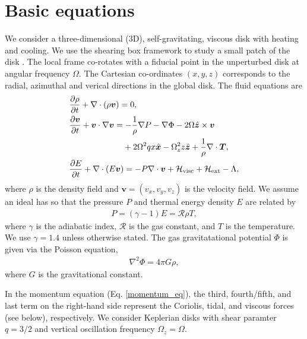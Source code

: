 \section{Basic equations}
We consider a three-dimensional (3D), self-gravitating,
viscous disk with heating and cooling. We use the shearing box framework to
study a small patch of the disk \citep{goldreich65}. The local frame
co-rotates with a fiducial point in the unperturbed disk at angular
frequency $\Omega$. The Cartesian co-ordinates $(x,y,z)$ corresponds
to the radial, azimuthal and verical directions in the global disk. 
The fluid equations are
\begin{align}
  &\frac{\p\rho}{\p t} + \nabla\cdot\left(\rho\bm{v}\right) = 0, \\
  & \frac{\p\bm{v}}{\p t} + \bm{v}\cdot\nabla\bm{v} =
  -\frac{1}{\rho}\nabla P - \nabla\Phi - 2\Omega\hat{\bm{z}}\times\bm{v}\notag\\ & 
  \phantom{\frac{\p\bm{v}}{\p t} + \bm{v}\cdot\nabla\bm{v} =}
  +2\Omega^2qx\hat{\bm{x}} -\Omega_z^2z\hat{\bm{z}} 
   + \frac{1}{\rho}\nabla\cdot\bm{T},\label{momentum_eq}\\
  & \frac{\p E}{\p t} + \nabla\cdot\left(E\bm{v}\right) = - P
  \nabla\cdot\bm{v} + \mathcal{H}_\mathrm{visc} +
  \mathcal{H}_\mathrm{ext} - \Lambda,\label{energy_eq}
\end{align} 
where $\rho$ is the density field and $\bm{v} = (v_x, v_y, v_z)$ is
the velocity field.%
We assume an ideal has so that the pressure $P$ and thermal energy
density $E$ are related by  
\begin{align}
  P = (\gamma-1)E = \mathcal{R}\rho T, 
\end{align}
where $\gamma$ is the adiabatic index, $\mathcal{R}$ is the gas
constant, and $T$ is the temperature. We use $\gamma=1.4$ unless
otherwise stated. The gas 
gravitatational potential $\Phi$ is given via the Poisson equation,  
\begin{align}
 \nabla^2\Phi = 4 \pi G \rho, 
\end{align}
where $G$ is the gravitational constant.  

In the momentum equation (Eq. \ref{momentum_eq}), the third,
fourth/fifth, and last term on the right-hand side represent the Coriolis, 
tidal, and viscous forces (see below), respectively. We consider    
Keplerian disks with shear paramter $q=3/2$ and vertical oscillation 
frequency $\Omega_z=\Omega$.  

